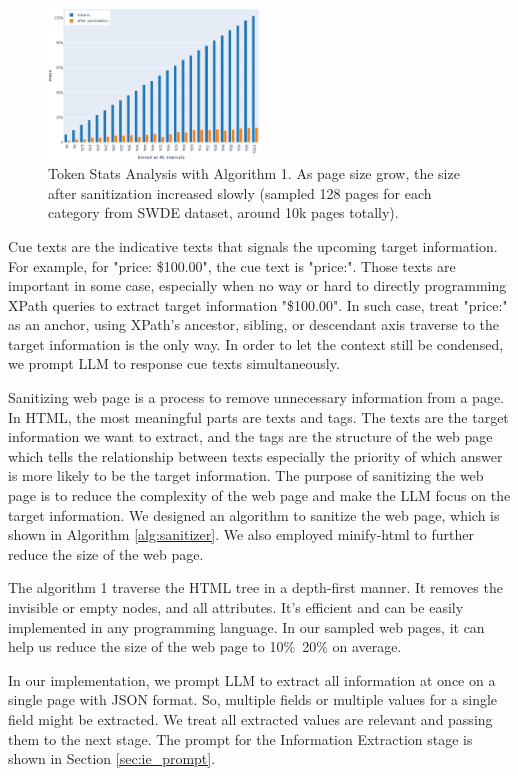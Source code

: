 \documentclass[a4paper]{article}
\begin{document}
\begin{figure}[h]
  \centering
  \includegraphics[width=0.5\textwidth]{./ie_token_stats.eps}
  \caption{Token Stats Analysis with Algorithm 1. As page size grow, the size after sanitization increased slowly (sampled 128 pages for each category from SWDE dataset, around 10k pages totally).}
  \label{fig:ie_token_stats}
\end{figure}

Cue texts are the indicative texts that signals the upcoming target information. For example, for "price: \$100.00", the cue text is "price:". Those texts are important in some case, especially when no way or hard to directly programming XPath queries to extract target information "\$100.00". In such case, treat "price:" as an anchor, using XPath's ancestor, sibling, or descendant axis traverse to the target information is the only way. In order to let the context still be condensed, we prompt LLM to response cue texts simultaneously.

Sanitizing web page is a process to remove unnecessary information from a page. In HTML, the most meaningful parts are texts and tags. The texts are the target information we want to extract, and the tags are the structure of the web page which tells the relationship between texts especially the priority of which answer is more likely to be the target information. The purpose of sanitizing the web page is to reduce the complexity of the web page and make the LLM focus on the target information. We designed an algorithm to sanitize the web page, which is shown in Algorithm \ref{alg:sanitizer}. We also employed minify-html\cite{minifyhtml} to further reduce the size of the web page.

The algorithm 1 traverse the HTML tree in a depth-first manner. It removes the invisible or empty nodes, and all attributes. It's efficient and can be easily implemented in any programming language. In our sampled web pages, it can help us reduce the size of the web page to 10\%~20\% on average.

In our implementation, we prompt LLM to extract all information at once on a single page with JSON format. So, multiple fields or multiple values for a single field might be extracted. We treat all extracted values are relevant and passing them to the next stage. The prompt for the Information Extraction stage is shown in Section \ref{sec:ie_prompt}.
\end{document}
